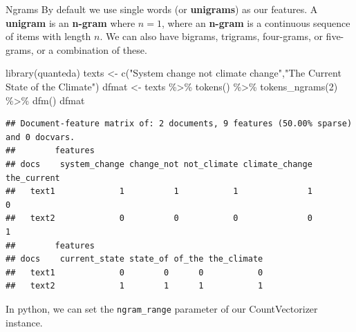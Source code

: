 \documentclass[
  10pt,
  ignorenonframetext,
  aspectratio=169]{beamer}
\newenvironment{Shaded}{\begin{snugshade}}{\end{snugshade}}
\newcommand{\DecValTok}[1]{\textcolor[rgb]{0.86,0.86,0.80}{#1}}
\newcommand{\FunctionTok}[1]{\textcolor[rgb]{0.94,0.94,0.56}{#1}}
\newcommand{\NormalTok}[1]{\textcolor[rgb]{0.80,0.80,0.80}{#1}}
\newcommand{\OtherTok}[1]{\textcolor[rgb]{0.94,0.94,0.56}{#1}}
\newcommand{\SpecialCharTok}[1]{\textcolor[rgb]{0.86,0.64,0.64}{#1}}
\newcommand{\StringTok}[1]{\textcolor[rgb]{0.80,0.58,0.58}{#1}}
\begin{document}
\begin{frame}[fragile]{Ngrams}
\protect\hypertarget{ngrams}{}
By default we use single words (or \textbf{unigrams}) as our features. A
\textbf{unigram} is an \textbf{n-gram} where \(n=1\), where an
\textbf{n-gram} is a continuous sequence of items with length \(n\). We
can also have bigrams, trigrams, four-grams, or five-grams, or a
combination of these.

\smallskip

\scriptsize

\begin{Shaded}
\begin{Highlighting}[]
\FunctionTok{library}\NormalTok{(quanteda)}
\NormalTok{texts }\OtherTok{\textless{}{-}} \FunctionTok{c}\NormalTok{(}\StringTok{"System change not climate change"}\NormalTok{,}\StringTok{"The Current State of the Climate"}\NormalTok{)}
\NormalTok{dfmat }\OtherTok{\textless{}{-}}\NormalTok{ texts }\SpecialCharTok{\%\textgreater{}\%}
  \FunctionTok{tokens}\NormalTok{() }\SpecialCharTok{\%\textgreater{}\%}
  \FunctionTok{tokens\_ngrams}\NormalTok{(}\DecValTok{2}\NormalTok{) }\SpecialCharTok{\%\textgreater{}\%} 
  \FunctionTok{dfm}\NormalTok{()}
\NormalTok{dfmat}
\end{Highlighting}
\end{Shaded}

\begin{verbatim}
## Document-feature matrix of: 2 documents, 9 features (50.00% sparse) and 0 docvars.
##        features
## docs    system_change change_not not_climate climate_change the_current
##   text1             1          1           1              1           0
##   text2             0          0           0              0           1
##        features
## docs    current_state state_of of_the the_climate
##   text1             0        0      0           0
##   text2             1        1      1           1
\end{verbatim}

\normalsize

In python, we can set the \texttt{ngram\_range} parameter of our
CountVectorizer instance.
\end{frame}
\end{document}
